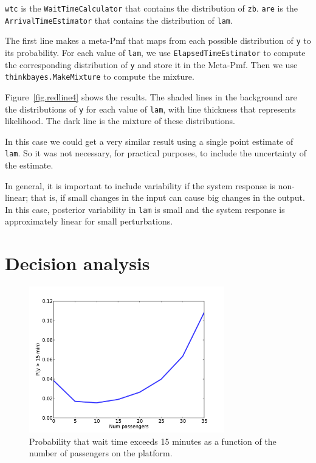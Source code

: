 \documentclass[12pt]{book}
\begin{document}
{\tt wtc} is the {\tt WaitTimeCalculator} that contains the
distribution of {\tt zb}.  {\tt are} is the {\tt ArrivalTimeEstimator}
that contains the distribution of {\tt lam}.

The first line makes a meta-Pmf that maps from each possible
distribution of {\tt y} to its probability.  For each value
of {\tt lam}, we use {\tt ElapsedTimeEstimator} to
compute the corresponding distribution of
{\tt y} and store it in the Meta-Pmf.  Then
we use {\tt thinkbayes.MakeMixture} to compute the mixture.


Figure~\ref{fig.redline4} shows the results.  The shaded lines
in the background are the distributions of {\tt y} for each value
of {\tt lam}, with line thickness that represents likelihood.
The dark line is the mixture of these distributions.

In this case we could get a very similar result using a single point
estimate of {\tt lam}.  So it was not necessary, for practical purposes,
to include the uncertainty of the estimate.

In general, it is important to include variability if the system
response is non-linear; that is, if small changes in the input can
cause big changes in the output.  In this case, posterior variability
in {\tt lam} is small and the system response is approximately
linear for small perturbations.


\section{Decision analysis}

\begin{figure}
\centerline{\includegraphics[height=2.5in]{figs/redline5.pdf}}
\caption{Probability that wait time exceeds 15 minutes as
a function of the number of passengers on the platform. }
\label{fig.redline5}
\end{figure}
\end{document}
